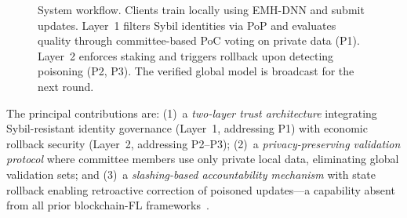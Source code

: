 \documentclass[conference]{IEEEtran}
\begin{document}
\begin{figure}[t]
{%
}
\caption{System workflow. Clients train locally using EMH-DNN and submit updates. Layer~1 filters Sybil identities via PoP and evaluates quality through committee-based PoC voting on private data (P1). Layer~2 enforces staking and triggers rollback upon detecting poisoning (P2, P3). The verified global model is broadcast for the next round.}
\label{fig:system}
\end{figure}

The principal contributions are: (1)~a \emph{two-layer trust architecture} integrating Sybil-resistant identity governance (Layer~1, addressing P1) with economic rollback security (Layer~2, addressing P2--P3); (2)~a \emph{privacy-preserving validation protocol} where committee members use only private local data, eliminating global validation sets; and (3)~a \emph{slashing-based accountability mechanism} with state rollback enabling retroactive correction of poisoned updates---a capability absent from all prior blockchain-FL frameworks~\cite{jebreel2023fl, alashhab2024enhancing, asiri2023understanding, jayagopal2023intrusion}.
\end{document}
